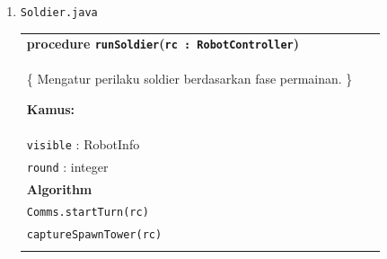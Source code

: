 \documentclass{article}
\newenvironment{pseudobox}
{
\centering
\begin{longtable}{|p{0.94\linewidth}|}
\hline
}
{
\\ \hline
\end{longtable}
\vspace{0.05cm}
}
\begin{document}
\begin{enumerate}[label=\alph*.]
\begin{pseudobox}
\hspace*{4.5em}else if \texttt{robotType = SPLASHER} then \\
\hspace*{6em}\texttt{Splasher.runSplasher(rc)} \\

\hspace*{4.5em}else \\
\hspace*{6em}\texttt{Tower.runTower(rc)} \\
\hspace*{4.5em}endif \\

\hspace*{3em}catch GameActionException \\
\hspace*{4.5em}print ``GameActionException'' \\

\hspace*{3em}catch Exception \\
\hspace*{4.5em}print ``Exception'' \\

\hspace*{3em}finally \\
\hspace*{4.5em}\texttt{Clock.yield()} \\

\hspace*{1.5em}endwhile

\end{pseudobox}

\item \texttt{Soldier.java}

\begin{pseudobox}
\textbf{procedure \texttt{runSoldier}(\texttt{rc : RobotController})} \\
\{ Mengatur perilaku soldier berdasarkan fase permainan. \}

\textbf{Kamus:} \\
\hspace*{1.5em}\texttt{visible} : RobotInfo \\
\hspace*{1.5em}\texttt{round} : integer \\

\textbf{Algorithm} \\

\hspace*{1.5em}\texttt{Comms.startTurn(rc)} \\
\hspace*{1.5em}\texttt{captureSpawnTower(rc)} \\


\end{pseudobox}
\end{enumerate}
\end{document}
